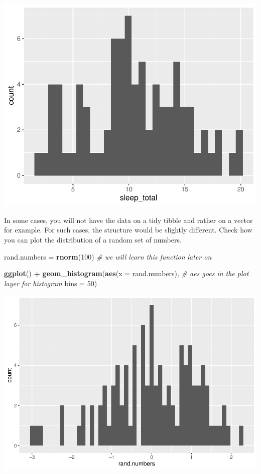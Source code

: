 \documentclass[
]{book}
\newenvironment{Shaded}{\begin{snugshade}}{\end{snugshade}}
\newcommand{\AttributeTok}[1]{\textcolor[rgb]{0.13,0.29,0.53}{#1}}
\newcommand{\CommentTok}[1]{\textcolor[rgb]{0.56,0.35,0.01}{\textit{#1}}}
\newcommand{\DecValTok}[1]{\textcolor[rgb]{0.00,0.00,0.81}{#1}}
\newcommand{\FunctionTok}[1]{\textcolor[rgb]{0.13,0.29,0.53}{\textbf{#1}}}
\newcommand{\NormalTok}[1]{#1}
\newcommand{\OtherTok}[1]{\textcolor[rgb]{0.56,0.35,0.01}{#1}}
\newcommand{\SpecialCharTok}[1]{\textcolor[rgb]{0.81,0.36,0.00}{\textbf{#1}}}
\begin{document}
\includegraphics{_main_files/figure-latex/unnamed-chunk-21-1.pdf}

In some cases, you will not have the data on a tidy tibble and rather on a vector for example.
For such cases, the structure would be slightly different.
Check how you can plot the distribution of a random set of numbers.

\begin{Shaded}
\begin{Highlighting}[]
\NormalTok{rand.numbers }\OtherTok{=} \FunctionTok{rnorm}\NormalTok{(}\DecValTok{100}\NormalTok{) }\CommentTok{\# we will learn this function later on}

\FunctionTok{ggplot}\NormalTok{() }\SpecialCharTok{+}   
  \FunctionTok{geom\_histogram}\NormalTok{(}\FunctionTok{aes}\NormalTok{(}\AttributeTok{x =}\NormalTok{ rand.numbers),  }\CommentTok{\# aes goes in the plot layer for histogram}
                 \AttributeTok{bins =} \DecValTok{50}\NormalTok{)}
\end{Highlighting}
\end{Shaded}

\includegraphics{_main_files/figure-latex/unnamed-chunk-22-1.pdf}
\end{document}
